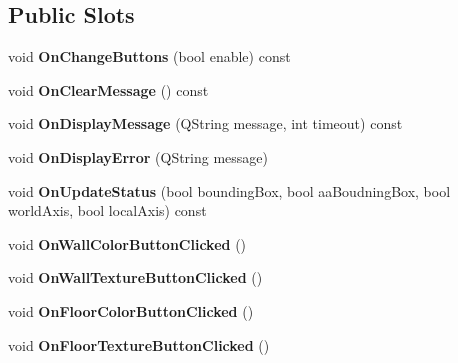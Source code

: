 \subsection*{Public Slots}
\begin{DoxyCompactItemize}
\item 
\hypertarget{class_main_window_abbfa33a7dbb6b6030aa117806e2a36dd}{}void {\bfseries On\+Change\+Buttons} (bool enable) const \label{class_main_window_abbfa33a7dbb6b6030aa117806e2a36dd}

\item 
\hypertarget{class_main_window_a28331903348b5b595826b88cc4ec8d65}{}void {\bfseries On\+Clear\+Message} () const \label{class_main_window_a28331903348b5b595826b88cc4ec8d65}

\item 
\hypertarget{class_main_window_a653116cd69aa29994ba258b6ae017aa1}{}void {\bfseries On\+Display\+Message} (Q\+String message, int timeout) const \label{class_main_window_a653116cd69aa29994ba258b6ae017aa1}

\item 
\hypertarget{class_main_window_ac6d6167eed399f17310482299e5600be}{}void {\bfseries On\+Display\+Error} (Q\+String message)\label{class_main_window_ac6d6167eed399f17310482299e5600be}

\item 
\hypertarget{class_main_window_a1d28d674453152dece0a01678317b212}{}void {\bfseries On\+Update\+Status} (bool bounding\+Box, bool aa\+Boudning\+Box, bool world\+Axis, bool local\+Axis) const \label{class_main_window_a1d28d674453152dece0a01678317b212}

\item 
\hypertarget{class_main_window_aece5c2367706593bc723197c31dba842}{}void {\bfseries On\+Wall\+Color\+Button\+Clicked} ()\label{class_main_window_aece5c2367706593bc723197c31dba842}

\item 
\hypertarget{class_main_window_a128805a4505588f76abb1fb6897b75ab}{}void {\bfseries On\+Wall\+Texture\+Button\+Clicked} ()\label{class_main_window_a128805a4505588f76abb1fb6897b75ab}

\item 
\hypertarget{class_main_window_a518fec1c228151b47ed59a2f0a0ad7cf}{}void {\bfseries On\+Floor\+Color\+Button\+Clicked} ()\label{class_main_window_a518fec1c228151b47ed59a2f0a0ad7cf}

\item 
\hypertarget{class_main_window_a162c53dee72bb98df3255a4a3f30eb06}{}void {\bfseries On\+Floor\+Texture\+Button\+Clicked} ()\label{class_main_window_a162c53dee72bb98df3255a4a3f30eb06}

\end{DoxyCompactItemize}
